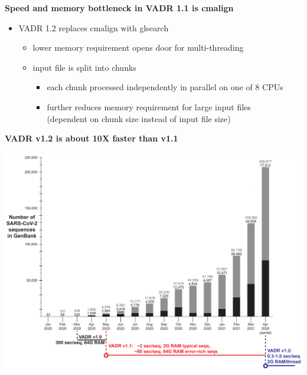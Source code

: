 \documentclass[landscape]{slides}
\begin{document}
\begin{slide}
\begin{center}
\textbf{Speed and memory bottleneck in VADR 1.1 is cmalign}
\end{center}

\begin{itemize}
\item VADR 1.2 replaces cmalign with glsearch
  \begin{itemize}
  \item lower memory requirement opens door for multi-threading
  \item input file is split into chunks
    \begin{itemize}
    \item each chunk processed independently in parallel on one of 8 CPUs
    \item further reduces memory requirement for large input files \\ (dependent on chunk size
      instead of input file size)
    \end{itemize}
  \end{itemize}
\end{itemize}
  
\vfill
\end{slide}
\begin{slide}
\begin{center}
\textbf{VADR v1.2 is about 10X faster than v1.1}

\includegraphics[width=10.25in]{figs/sars-counts-jan2020-apr2021-slide2}
\end{center}

\vfill
\end{slide}
\end{document}
